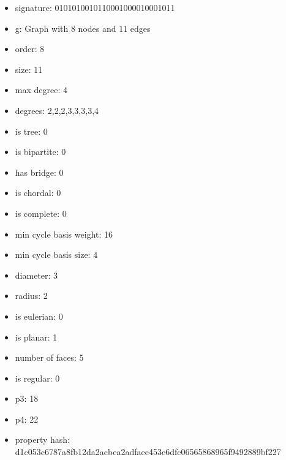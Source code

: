 \begin{itemize}
\item signature: 0101010010110001000010001011
\item g: Graph with 8 nodes and 11 edges
\item order: 8
\item size: 11
\item max degree: 4
\item degrees: 2,2,2,3,3,3,3,4
\item is tree: 0
\item is bipartite: 0
\item has bridge: 0
\item is chordal: 0
\item is complete: 0
\item min cycle basis weight: 16
\item min cycle basis size: 4
\item diameter: 3
\item radius: 2
\item is eulerian: 0
\item is planar: 1
\item number of faces: 5
\item is regular: 0
\item p3: 18
\item p4: 22
\item property hash: d1c053c6787a8fb12da2acbea2adfaee453e6dfc06565868965f9492889bf227
\end{itemize}
\newpage
\begin{figure}
\end{figure}

